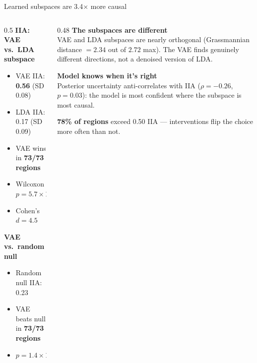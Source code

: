 \documentclass[aspectratio=169,11pt]{beamer}
\begin{document}
\begin{frame}{Learned subspaces are 3.4$\times$ more causal}
\begin{columns}[T]
\begin{column}{0.5\textwidth}
\textbf{IIA: VAE vs.\ LDA subspace}
\begin{itemize}\setlength\itemsep{1pt}
  \item VAE IIA: \textbf{0.56} (SD 0.08)
  \item LDA IIA: 0.17 (SD 0.09)
  \item VAE wins in \textbf{73/73 regions}
  \item Wilcoxon $p = 5.7 \times 10^{-14}$
  \item Cohen's $d = 4.5$
\end{itemize}

\vspace{0.3em}
\textbf{VAE vs.\ random null}
\begin{itemize}\setlength\itemsep{1pt}
  \item Random null IIA: 0.23
  \item VAE beats null in \textbf{73/73 regions}
  \item $p = 1.4 \times 10^{-25}$
\end{itemize}
\end{column}
\begin{column}{0.48\textwidth}
\textbf{The subspaces are different}\\[0.3em]
{\small VAE and LDA subspaces are nearly orthogonal (Grassmannian distance $= 2.34$ out of $2.72$ max). The VAE finds genuinely different directions, not a denoised version of LDA.}

\vspace{0.5em}
\textbf{Model knows when it's right}\\[0.3em]
{\small Posterior uncertainty anti-correlates with IIA ($\rho = -0.26$, $p = 0.03$): the model is most confident where the subspace is most causal.}

\vspace{0.5em}
\textbf{78\% of regions} exceed 0.50 IIA --- interventions flip the choice more often than not.
\end{column}
\end{columns}
\end{frame}
\end{document}

